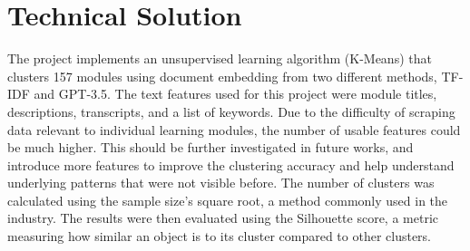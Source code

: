 \chapter{Technical Solution}
\label{ch:tchnicalsolution}

The project implements an unsupervised learning algorithm (K-Means) that clusters 157 modules using document embedding from two different methods, TF-IDF and GPT-3.5. The text features used for this project were module titles, descriptions, transcripts, and a list of keywords. Due to the difficulty of scraping data relevant to individual learning modules, the number of usable features could be much higher. This should be further investigated in future works, and introduce more features to improve the clustering accuracy and help understand underlying patterns that were not visible before. The number of clusters was calculated using the sample size's square root, a method commonly used in the industry. The results were then evaluated using the Silhouette score, a metric measuring how similar an object is to its cluster compared to other clusters.

